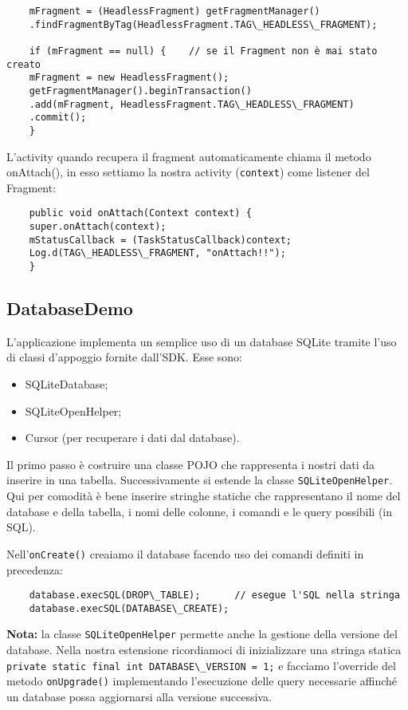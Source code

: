 \begin{itemize}
	\begin{lstlisting}
	mFragment = (HeadlessFragment) getFragmentManager()
	.findFragmentByTag(HeadlessFragment.TAG\_HEADLESS\_FRAGMENT);
	
	if (mFragment == null) {	// se il Fragment non è mai stato creato
	mFragment = new HeadlessFragment();
	getFragmentManager().beginTransaction()
	.add(mFragment, HeadlessFragment.TAG\_HEADLESS\_FRAGMENT)
	.commit();
	}
	\end{lstlisting}
	
	L'activity quando recupera il fragment automaticamente chiama il metodo onAttach(), in esso settiamo la nostra activity (\lstinline|context|) come listener del Fragment:
	
	\begin{lstlisting}
	public void onAttach(Context context) {
	super.onAttach(context);
	mStatusCallback = (TaskStatusCallback)context;
	Log.d(TAG\_HEADLESS\_FRAGMENT, "onAttach!!");
	}
	\end{lstlisting}
	
	
	
	\subsection{DatabaseDemo}
	L'applicazione implementa un semplice uso di un database SQLite tramite l'uso di classi d'appoggio fornite dall'SDK. Esse sono:
	\begin{itemize}
		\item SQLiteDatabase;
		\item SQLiteOpenHelper;
		\item Cursor (per recuperare i dati dal database).
	\end{itemize}
	
	Il primo passo è costruire una classe POJO che rappresenta i nostri dati da inserire in una tabella. Successivamente si estende la classe \lstinline|SQLiteOpenHelper|. Qui per comodità è bene inserire stringhe statiche che rappresentano il nome del database e della tabella, i nomi delle colonne, i comandi e le query possibili (in SQL).
	
	Nell'\lstinline|onCreate()| creaiamo il database facendo uso dei comandi definiti in precedenza:
	\begin{lstlisting}
	database.execSQL(DROP\_TABLE);		// esegue l'SQL nella stringa
	database.execSQL(DATABASE\_CREATE);
	\end{lstlisting}
	
	\textbf{Nota:} la classe \lstinline|SQLiteOpenHelper| permette anche la gestione della versione del database. Nella nostra estensione ricordiamoci di inizializzare una stringa statica \lstinline|private static final int DATABASE\_VERSION = 1;| e facciamo l'override del metodo \lstinline|onUpgrade()| implementando l'esecuzione delle query necessarie affinché un database possa aggiornarsi alla versione successiva.
	

\end{itemize}
